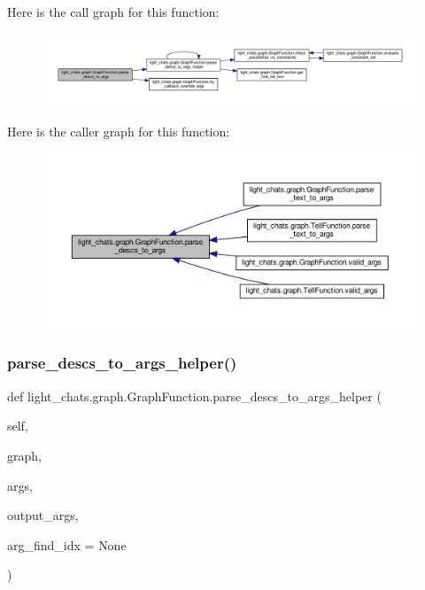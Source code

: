 Here is the call graph for this function\+:
\nopagebreak
\begin{figure}[H]
\begin{center}
\leavevmode
\includegraphics[width=350pt]{classlight__chats_1_1graph_1_1GraphFunction_a8b76e8a8bb07f75abd081e220683dbd4_cgraph}
\end{center}
\end{figure}
Here is the caller graph for this function\+:
\nopagebreak
\begin{figure}[H]
\begin{center}
\leavevmode
\includegraphics[width=350pt]{classlight__chats_1_1graph_1_1GraphFunction_a8b76e8a8bb07f75abd081e220683dbd4_icgraph}
\end{center}
\end{figure}
\mbox{\label{classlight__chats_1_1graph_1_1GraphFunction_a33a25a071385ffbd0a222cab65c543d4}} 
\subsubsection{\texorpdfstring{parse\+\_\+descs\+\_\+to\+\_\+args\+\_\+helper()}{parse\_descs\_to\_args\_helper()}}
{\footnotesize\ttfamily def light\+\_\+chats.\+graph.\+Graph\+Function.\+parse\+\_\+descs\+\_\+to\+\_\+args\+\_\+helper (\begin{DoxyParamCaption}\item[{}]{self,  }\item[{}]{graph,  }\item[{}]{args,  }\item[{}]{output\+\_\+args,  }\item[{}]{arg\+\_\+find\+\_\+idx = {\ttfamily None} }\end{DoxyParamCaption})}



